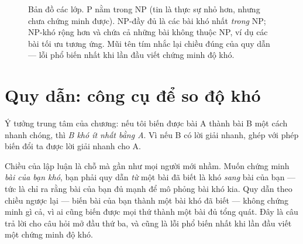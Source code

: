 \documentclass[../../algorithm.tex]{subfiles}
\begin{document}
\begin{figure}[H]\centering
{}
\caption{Bản đồ các lớp. P nằm trong NP (tin là thực sự nhỏ hơn, nhưng chưa chứng minh được). NP-đầy đủ là các bài khó nhất \emph{trong} NP; NP-khó rộng hơn và chứa cả những bài không thuộc NP, ví dụ các bài tối ưu tương ứng. Mũi tên tím nhắc lại chiều đúng của quy dẫn --- lỗi phổ biến nhất khi lần đầu viết chứng minh độ khó.}
\label{fig:np-map}
\end{figure}

\section{Quy dẫn: công cụ để so độ khó}

Ý tưởng trung tâm của chương: nếu tôi biến được bài A thành bài B một cách nhanh chóng, thì \emph{B khó ít nhất bằng A}. Vì nếu B có lời giải nhanh, ghép với phép biến đổi ta được lời giải nhanh cho A.

Chiều của lập luận là chỗ mà gần như mọi người mới nhầm. Muốn chứng minh \emph{bài của bạn khó}, bạn phải quy dẫn \emph{từ} một bài đã biết là khó \emph{sang} bài của bạn --- tức là chỉ ra rằng bài của bạn đủ mạnh để mô phỏng bài khó kia. Quy dẫn theo chiều ngược lại --- biến bài của bạn thành một bài khó đã biết --- không chứng minh gì cả, vì ai cũng biến được mọi thứ thành một bài đủ tổng quát. Đây là câu trả lời cho câu hỏi mở đầu thứ ba, và cũng là lỗi phổ biến nhất khi lần đầu viết một chứng minh độ khó.
\end{document}
